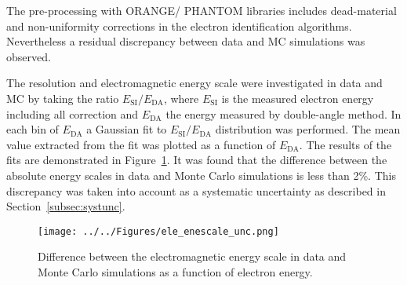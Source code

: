 The pre-processing with ORANGE/ PHANTOM libraries includes dead-material and non-uniformity corrections in the electron identification algorithms. Nevertheless a residual discrepancy between data and MC simulations was observed. 

The resolution and electromagnetic energy scale were investigated in data and MC by taking the ratio $E_\text{SI}/E_\text{DA}$, where $E_\text{SI}$ is the measured electron energy including all correction and $E_\text{DA}$ the energy measured by double-angle method. In each bin of $E_\text{DA}$ a Gaussian fit to $E_\text{SI}/E_\text{DA}$ distribution was performed. The mean value extracted from the fit was plotted as a function of $E_\text{DA}$. The results of the fits are demonstrated in Figure~\ref{fig:ele_enescale_unc}. It was found that the difference between the absolute energy scales in data and Monte Carlo simulations is less than 2\%. This discrepancy was taken into account as a systematic uncertainty as described in Section~\ref{subsec:systunc}.
\begin{figure}
	\centering
		\texttt{[image: ../../Figures/ele\_enescale\_unc.png]}
	\caption{Difference between the electromagnetic energy scale in data and Monte Carlo simulations as a function of electron energy.}
	\label{fig:ele_enescale_unc}
\end{figure}

